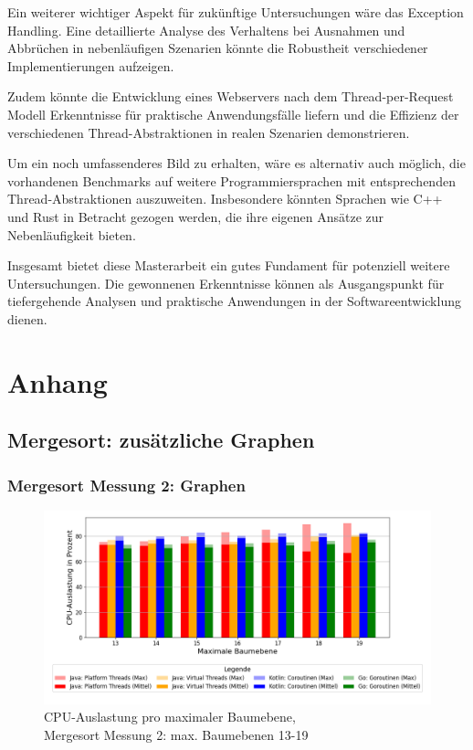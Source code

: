 \documentclass[fontsize=12pt,paper=a4,twoside=semi,parskip=half-,headsepline,headinclude]{scrreprt}
\begin{document}
Ein weiterer wichtiger Aspekt für zukünftige Untersuchungen wäre das Exception Handling. Eine detaillierte Analyse des Verhaltens bei Ausnahmen und Abbrüchen in nebenläufigen Szenarien könnte die Robustheit verschiedener Implementierungen aufzeigen.

Zudem könnte die Entwicklung eines Webservers nach dem Thread-per-Request Modell Erkenntnisse für praktische Anwendungsfälle liefern und die Effizienz der verschiedenen Thread-Abstraktionen in realen Szenarien demonstrieren.

Um ein noch umfassenderes Bild zu erhalten, wäre es alternativ auch möglich, die vorhandenen Benchmarks auf weitere Programmiersprachen mit entsprechenden Thread-Abstraktionen auszuweiten. Insbesondere könnten Sprachen wie C++ und Rust in Betracht gezogen werden, die ihre eigenen Ansätze zur Nebenläufigkeit bieten.

Insgesamt bietet diese Masterarbeit ein gutes Fundament für potenziell weitere Untersuchungen. Die gewonnenen Erkenntnisse können als Ausgangspunkt für tiefergehende Analysen und praktische Anwendungen in der Softwareentwicklung dienen.


\printbibliography


\chapter{Anhang}

\section{Mergesort: zusätzliche Graphen}

\subsection{Mergesort Messung 2: Graphen}

\begin{figure}[H]
	\centering
	\includegraphics[scale=0.5]{figures/mergesort/Maximalebauebenen1-19_pvcg/cpu_usage_bar_plot.png}
	\caption{CPU-Auslastung pro maximaler Baumebene,\\ Mergesort Messung 2: max. Baumebenen 13-19}
	\label{fig:ms1-19CPU}
\end{figure}
\end{document}
